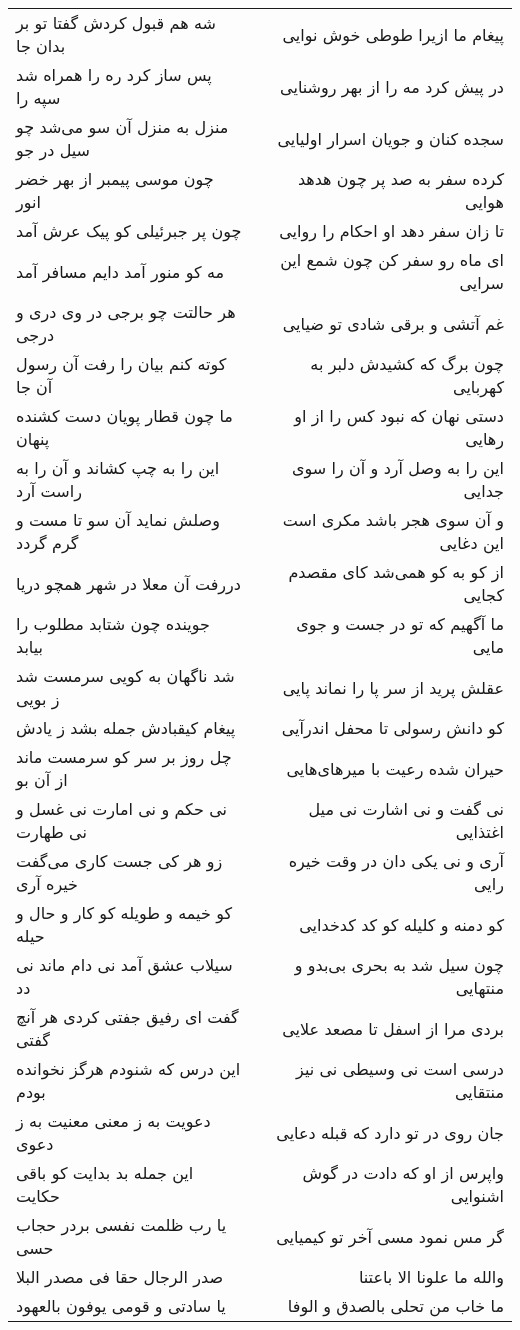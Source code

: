 \begin{center}
\begin{longtable}{l p{0.5cm} r}
شه هم قبول کردش گفتا تو بر بدان جا
&&
پیغام ما ازیرا طوطی خوش نوایی
\\
پس ساز کرد ره را همراه شد سپه را
&&
در پیش کرد مه را از بهر روشنایی
\\
منزل به منزل آن سو می‌شد چو سیل در جو
&&
سجده کنان و جویان اسرار اولیایی
\\
چون موسی پیمبر از بهر خضر انور
&&
کرده سفر به صد پر چون هدهد هوایی
\\
چون پر جبرئیلی کو پیک عرش آمد
&&
تا زان سفر دهد او احکام را روایی
\\
مه کو منور آمد دایم مسافر آمد
&&
ای ماه رو سفر کن چون شمع این سرایی
\\
هر حالتت چو برجی در وی دری و درجی
&&
غم آتشی و برقی شادی تو ضیایی
\\
کوته کنم بیان را رفت آن رسول آن جا
&&
چون برگ که کشیدش دلبر به کهربایی
\\
ما چون قطار پویان دست کشنده پنهان
&&
دستی نهان که نبود کس را از او رهایی
\\
این را به چپ کشاند و آن را به راست آرد
&&
این را به وصل آرد و آن را سوی جدایی
\\
وصلش نماید آن سو تا مست و گرم گردد
&&
و آن سوی هجر باشد مکری است این دغایی
\\
دررفت آن معلا در شهر همچو دریا
&&
از کو به کو همی‌شد کای مقصدم کجایی
\\
جوینده چون شتابد مطلوب را بیابد
&&
ما آگهیم که تو در جست و جوی مایی
\\
شد ناگهان به کویی سرمست شد ز بویی
&&
عقلش پرید از سر پا را نماند پایی
\\
پیغام کیقبادش جمله بشد ز یادش
&&
کو دانش رسولی تا محفل اندرآیی
\\
چل روز بر سر کو سرمست ماند از آن بو
&&
حیران شده رعیت با میرهای‌هایی
\\
نی حکم و نی امارت نی غسل و نی طهارت
&&
نی گفت و نی اشارت نی میل اغتذایی
\\
زو هر کی جست کاری می‌گفت خیره آری
&&
آری و نی یکی دان در وقت خیره رایی
\\
کو خیمه و طویله کو کار و حال و حیله
&&
کو دمنه و کلیله کو کد کدخدایی
\\
سیلاب عشق آمد نی دام ماند نی دد
&&
چون سیل شد به بحری بی‌بدو و منتهایی
\\
گفت ای رفیق جفتی کردی هر آنچ گفتی
&&
بردی مرا از اسفل تا مصعد علایی
\\
این درس که شنودم هرگز نخوانده بودم
&&
درسی است نی وسیطی نی نیز منتقایی
\\
دعویت به ز معنی معنیت به ز دعوی
&&
جان روی در تو دارد که قبله دعایی
\\
این جمله بد بدایت کو باقی حکایت
&&
واپرس از او که دادت در گوش اشنوایی
\\
یا رب ظلمت نفسی بردر حجاب حسی
&&
گر مس نمود مسی آخر تو کیمیایی
\\
صدر الرجال حقا فی مصدر البلا
&&
والله ما علونا الا باعتنا
\\
یا سادتی و قومی یوفون بالعهود
&&
ما خاب من تحلی بالصدق و الوفا
\\
\end{longtable}
\end{center}
